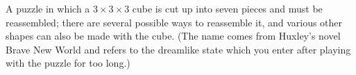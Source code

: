 A puzzle in which a $3 \times 3 \times 3$ cube is cut up into seven
pieces and must be reassembled; there are several 
possible ways to reassemble it, and various other
shapes can also be made with the cube.
(The name comes from Huxley's novel Brave New World
and refers to the dreamlike state which you enter
after playing with the puzzle for too long.)